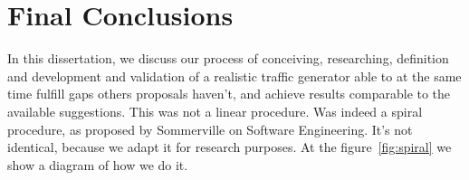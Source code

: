 




\section{Final Conclusions}


In this dissertation, we discuss our process of conceiving, researching, definition and development and validation of a realistic traffic generator able to at the same time fulfill gaps others proposals haven't, and achieve results comparable to the available suggestions. This was not a linear procedure. Was indeed a spiral procedure, as proposed by Sommerville on Software Engineering\cite{sommerville}. It's not identical, because we adapt it for research purposes. At the figure~\ref{fig:spiral} we show a diagram of how we do it. 

